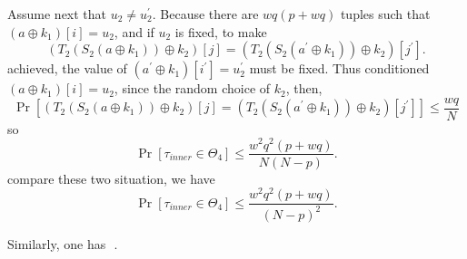 Assume next that $u_2 \neq u_2^{\prime}$. Because there are $w q (p+w q)$  tuples such that $\left(a \oplus k_{1}\right)[i] = u_2$, and if $u_2$ is fixed, to make 
$$
\left(T_{2}\left(S_{2}\left(a \oplus k_{1}\right)\right) \oplus k_{2}\right)[j] = \left(T_{2}\left(S_{2}\left(a^{\prime} \oplus k_{1}\right)\right) \oplus k_{2}\right)[j^{\prime}].
$$
\noindent achieved, the value of $\left(a^{\prime} \oplus k_{1}\right)[i^{\prime}] = u_2^{\prime}$ must be fixed. Thus conditioned $\left(a \oplus k_{1}\right)[i] = u_2$, since the random choice of $k_{2}$, then,
$$
\operatorname{Pr}\left[\left(T_{2}\left(S_{2}\left(a \oplus k_{1}\right)\right) \oplus k_{2}\right)[j]=\left(T_{2}\left(S_{2}\left(a^{\prime} \oplus k_{1}\right)\right) \oplus k_{2}\right)[j^{\prime}]\right] \leq \frac{w q}{N}
$$ 
\noindent so 
$$
\operatorname{Pr}\left[\tau_{inner} \in \Theta_{4}\right] \leq \frac{w^{2} q^2 (p+w q)}{N (N-p)}.
$$
\noindent compare these two situation, we have
$$
\operatorname{Pr}\left[\tau_{inner} \in \Theta_{4}\right] \leq \frac{w^{2} q^2 (p+w q)}{(N-p)^2}.
$$

\noindent Similarly, one has
$$
 \leq {}.






